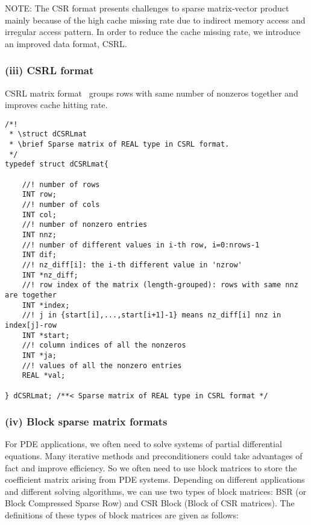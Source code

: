 \documentclass[11pt]{memoir}
\begin{document}
\begin{snugshade}\noindent
NOTE: The CSR format presents challenges to sparse matrix-vector product mainly because of the high cache missing rate due to indirect memory access and irregular access pattern. In order to reduce the cache missing rate, we introduce an improved data format, CSRL.
\end{snugshade}

\subsubsection*{(iii) CSRL format}

CSRL matrix format~\cite{Mellor-crummey2004} groups rows with same number of nonzeros together and improves cache hitting rate. 
\begin{lstlisting}
/*!
 * \struct dCSRLmat
 * \brief Sparse matrix of REAL type in CSRL format.
 */
typedef struct dCSRLmat{
    
	//! number of rows	
	INT row;
	//! number of cols
	INT col;
	//! number of nonzero entries
	INT nnz;
	//! number of different values in i-th row, i=0:nrows-1
	INT dif;
	//! nz_diff[i]: the i-th different value in 'nzrow'
	INT *nz_diff;
	//! row index of the matrix (length-grouped): rows with same nnz are together
	INT *index;
	//! j in {start[i],...,start[i+1]-1} means nz_diff[i] nnz in index[j]-row	
	INT *start;
	//! column indices of all the nonzeros
	INT *ja;
	//! values of all the nonzero entries
	REAL *val;
    
} dCSRLmat; /**< Sparse matrix of REAL type in CSRL format */
\end{lstlisting}

\subsubsection*{(iv) Block sparse matrix formats}

For PDE applications, we often need to solve systems of partial differential equations. Many iterative methods and preconditioners could take advantages of fact and improve efficiency. So we often need to use block matrices to store the coefficient matrix arising from PDE systems. Depending on different applications and different solving algorithms, we can use two types of block matrices: BSR (or Block Compressed Sparse Row) and CSR Block (Block of CSR matrices). The definitions of these types of block matrices are given as follows:
\end{document}
